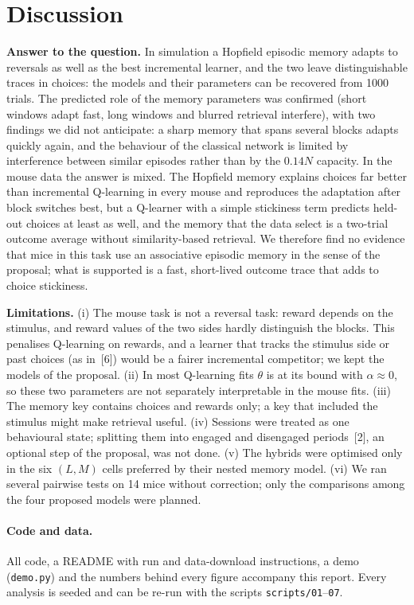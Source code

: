 \documentclass[10pt,a4paper]{article}
\begin{document}
\section{Discussion}
\textbf{Answer to the question.} In simulation a Hopfield episodic memory adapts to reversals as well as the
best incremental learner, and the two leave distinguishable traces in choices: the models and their parameters
can be recovered from 1000 trials. The predicted role of the memory parameters was confirmed (short windows adapt
fast, long windows and blurred retrieval interfere), with two findings we did not anticipate: a sharp memory that
spans several blocks adapts quickly again, and the behaviour of the classical network is limited by interference
between similar episodes rather than by the $0.14N$ capacity. In the mouse data the answer is mixed. The Hopfield
memory explains choices far better than incremental Q-learning in every mouse and reproduces the adaptation
after block switches best, but a Q-learner with a simple stickiness term predicts held-out choices at least as
well, and the memory that the data select is a two-trial outcome average without similarity-based retrieval.
We therefore find no evidence that mice in this task use an associative episodic memory in the sense of the
proposal; what is supported is a fast, short-lived outcome trace that adds to choice stickiness.

\textbf{Limitations.} (i) The mouse task is not a reversal task: reward depends on the stimulus, and reward
values of the two sides hardly distinguish the blocks. This penalises Q-learning on rewards, and a learner that
tracks the stimulus side or past choices (as in~[6]) would be a fairer incremental competitor; we kept the
models of the proposal. (ii) In most Q-learning fits $\theta$ is at its bound with $\alpha\approx0$, so these two
parameters are not separately interpretable in the mouse fits. (iii) The memory key contains choices and rewards
only; a key that included the stimulus might make retrieval useful. (iv) Sessions were treated as one behavioural
state; splitting them into engaged and disengaged periods~[2], an optional step of the proposal, was not done.
(v) The hybrids were optimised only in the six $(L,M)$ cells preferred by their nested memory model. (vi) We ran
several pairwise tests on 14 mice without correction; only the comparisons among the four proposed models were
planned.


\paragraph{Code and data.} All code, a README with run and data-download instructions, a demo
(\texttt{demo.py}) and the numbers behind every figure accompany this report. Every analysis is seeded and can be
re-run with the scripts \texttt{scripts/01}--\texttt{07}.
\end{document}
